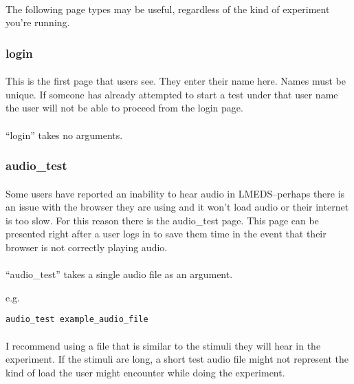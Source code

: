 \paragraph{}
The following page types may be useful, regardless of the kind of experiment you're running.

\subsubsection{login}

\paragraph{}
This is the first page that users see.  They enter their name here.  Names must be unique.  If someone has already attempted to start a test under that user name the user will not be able to proceed from the login page.

\paragraph{}
``login'' takes no arguments.

\subsubsection{audio\_test}

\paragraph{}
Some users have reported an inability to hear audio in LMEDS--perhaps there is an issue with the browser they are using and it won't load audio or their internet is too slow.  For this reason there is the audio\_test page.  This page can be presented right after a user logs in to save them time in the event that their browser is not correctly playing audio.

\paragraph{}
``audio\_test'' takes a single audio file as an argument.

e.g.

\begin{lstlisting}
audio_test example_audio_file
\end{lstlisting}

\paragraph{}
I recommend using a file that is similar to the stimuli they will hear in the experiment.  If the stimuli are long, a short test audio file might not represent the kind of load the user might encounter while doing the experiment.


